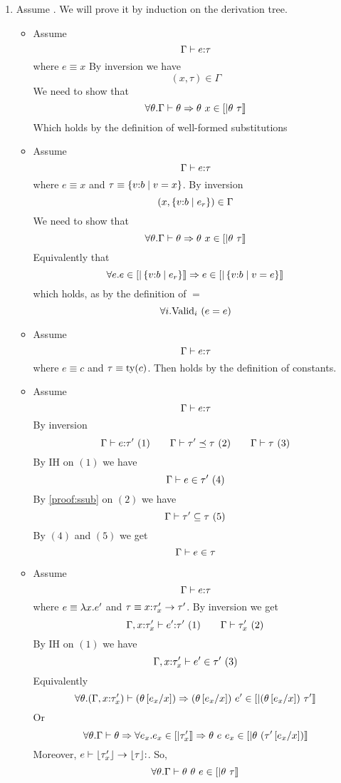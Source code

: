 \begin{enumerate}
\item Assume . 
We will prove it by induction on the derivation tree.

\begin{itemize}
\item\rtvar Assume
$$	\hastype{\Gamma}{e}{\tau}$$
where $e \equiv x$
By inversion we have
$$(x,\tau) \in \Gamma$$
We need to show that 
$$	\forall \theta . \iswellformed{\Gamma}{\theta} \Rightarrow \theta\ x \in \interp{\theta \ \tau}$$
Which holds by the definition of well-formed substitutions
\item\rtvarbase Assume
$$\hastype{\Gamma}{e}{\tau}$$
where $e\equiv x$ and $\tau\equiv\tref{v}{b}{v=x}$.
By inversion
$$(x,\tref{v}{b}{e_r}) \in \Gamma$$ 
We need to show that 
$$	\forall \theta . \iswellformed{\Gamma}{\theta} \Rightarrow \theta\ x \in \interp{\theta \ \tau}$$
Equivalently that 
$$\forall e.
 e\in\interp{\tref{v}{b}{e_r}} \Rightarrow e \in \interp{\tref{v}{b}{v = e}}$$
which holds, as by the definition of $=$
$$\generalconditionImplOne{e=e}$$
\item\rtconst Assume
$$\hastype{\Gamma}{e}{\tau}$$
where $e \equiv c$ and $\tau\equiv\ty{c}$.
Then  holds by the definition of constants.
\item\rtsub Assume 
$$	\hastype{\Gamma}{e}{\tau}$$
By inversion
$$
	\hastype{\Gamma}{e}{\tau'}\ (1) \qquad
	\issubtype{\Gamma}{\tau'}{\tau}\ (2) \qquad
	\iswellformed{\Gamma}{\tau}\ (3)
$$
By IH on $(1)$ we have
$$	\shastype{\Gamma}{e}{\tau'}\ (4)$$
By \ref{proof:ssub} on $(2)$ we have
$$	\sissubtype{\Gamma}{\tau'}{\tau}\ (5)$$
By $(4)$ and $(5)$ we get
$$	\shastype{\Gamma}{e}{\tau}$$
\item\rtfun Assume
$$	\hastype{\Gamma}{e}{\tau}$$
where $e \equiv \efun{x}{e'}$ and 
$\tau \equiv\tfun{x}{\tau'_x}{\tau'}$.
By inversion we get
$$
	\hastype{\Gamma, x\colon\tau'_x}{e'}{\tau'}\ (1) \qquad
	\iswellformed{\Gamma}{\tau'_x}\ (2)
$$
By IH on $(1)$ we have
$$
	\shastype{\Gamma, x\colon\tau'_x}{e'}{\tau'}\ (3)
$$
Equivalently
$$	
\forall \theta . \iswellformed{(\Gamma,x\colon\tau'_x)}{(\theta\sub{x}{e_x})} 
	\Rightarrow (\theta\sub{x}{e_x})\ e' \in \interp{(\theta\sub{x}{e_x}) \ \tau'}\\
$$
Or
$$	
\forall \theta . \iswellformed{\Gamma}{\theta} \Rightarrow
\forall e_x . e_x \in \interp{\tau'_x} \Rightarrow
	\theta\ \eapp{e}{e_x} \in \interp{\theta \ (\tau'\sub{x}{e_x})}\\
$$
Moreover, $\hastype{e}{\erase{\tau'_x}\rightarrow{\erase{\tau}}}$.
So,
$$	
\forall \theta . \iswellformed{\Gamma}{\theta}\ \theta\ e\in \interp{\theta\ \tau}
$$
\end{itemize}
\end{enumerate}
